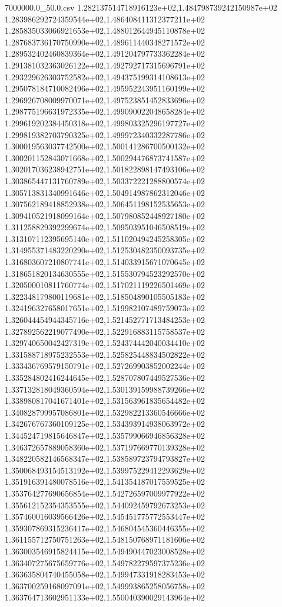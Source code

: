 \begin{filecontents*}{7000000.0_50.0.csv}
1.282137514718916123e+02,1.484798739242150987e+02
1.283986292724359544e+02,1.486408411312377211e+02
1.285835033066921653e+02,1.488012644945110878e+02
1.287683736170750990e+02,1.489611440348271572e+02
1.289532402460839364e+02,1.491204797733362284e+02
1.291381032363026122e+02,1.492792717315696791e+02
1.293229626303752582e+02,1.494375199314108613e+02
1.295078184710082496e+02,1.495952243951160199e+02
1.296926708009970071e+02,1.497523851452833696e+02
1.298775196631972335e+02,1.499090022048658284e+02
1.299619202384450318e+02,1.499803325296197727e+02
1.299819382703790325e+02,1.499972340332287786e+02
1.300019563037742500e+02,1.500141286700500132e+02
1.300201152843071668e+02,1.500294476873741587e+02
1.302017036238942751e+02,1.501822898147493106e+02
1.303865447131760789e+02,1.503372221288800574e+02
1.305713831340991646e+02,1.504914987862312046e+02
1.307562189418852938e+02,1.506451198152535653e+02
1.309410521918099164e+02,1.507980852448927180e+02
1.311258829392299674e+02,1.509503951046508519e+02
1.313107112395695140e+02,1.511020494245258305e+02
1.314955371483220290e+02,1.512530482350093735e+02
1.316803607210807741e+02,1.514033915671070645e+02
1.318651820134630555e+02,1.515530794523292570e+02
1.320500010811760774e+02,1.517021119226501469e+02
1.322348179800119681e+02,1.518504890105505183e+02
1.324196327658017651e+02,1.519982107489759073e+02
1.326044454944345716e+02,1.521452771713484253e+02
1.327892562219077490e+02,1.522916883115758537e+02
1.329740650042427319e+02,1.524374442040034410e+02
1.331588718975232553e+02,1.525825448834502822e+02
1.333436769579150791e+02,1.527269903852002244e+02
1.335284802416244645e+02,1.528707807449527536e+02
1.337132818049360594e+02,1.530139159988739266e+02
1.338980817041671401e+02,1.531563961835654482e+02
1.340828799957086801e+02,1.532982213360546666e+02
1.342676767360109125e+02,1.534393914938063972e+02
1.344524719815646847e+02,1.535799066946856328e+02
1.346372657889058360e+02,1.537197669770139328e+02
1.348220582146568347e+02,1.538589723794793827e+02
1.350068493154513192e+02,1.539975229412293629e+02
1.351916391480078516e+02,1.541354187017559525e+02
1.353764277690656854e+02,1.542726597009977922e+02
1.355612152354353555e+02,1.544092459792673253e+02
1.357460016039566426e+02,1.545451775772553447e+02
1.359307869315236417e+02,1.546804545360446355e+02
1.361155712750751263e+02,1.548150768971181606e+02
1.363003546915824415e+02,1.549490447023008528e+02
1.363407275675659776e+02,1.549782279597375236e+02
1.363635804740455058e+02,1.549947331918283453e+02
1.363700259168097091e+02,1.549993865258056758e+02
1.363764713602951133e+02,1.550040390029143964e+02

\end{filecontents*}
